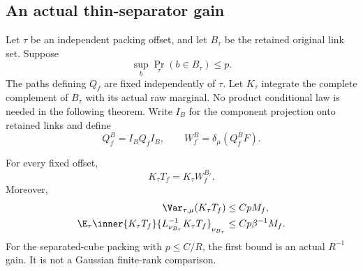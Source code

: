 \subsection{An actual thin-separator gain}

Let \(\tau\) be an independent packing offset, and let \(B_\tau\) be the
retained original link set. Suppose
\begin{equation}
 \sup_b\Pr_\tau(b\in B_\tau)\le p.
 \label{tr:thincondition}
\end{equation}
The paths defining \(Q_f\) are fixed independently of \(\tau\).
Let \(K_\tau\) integrate the complete complement of \(B_\tau\) with its
actual raw marginal. No product conditional law is needed in the following
theorem. Write \(I_B\) for the component projection onto retained links and
define
\[
 Q_f^B=I_BQ_fI_B,\qquad W_f^B=\delta_\mu(Q_f^BF).
\]

\begin{theorem}
\label{tr:separator}
For every fixed offset,
\begin{equation}
 K_\tau T_f=K_\tau W_f^{B_\tau}.
 \label{tr:maskidentity}
\end{equation}
Moreover,
\begin{align}
 \Var_{\tau,\mu}(K_\tau T_f)&\le CpM_f,
 \label{tr:meanthin}\\
 \E_\tau\inner{K_\tau T_f}
       {L_{\nu_{B_\tau}}^{-1}K_\tau T_f}_{\nu_{B_\tau}}
   &\le Cp\beta^{-1}M_f.
 \label{tr:inversethin}
\end{align}
For the separated-cube packing with \(p\le C/R\), the first bound is an
actual \(R^{-1}\) gain. It is not a Gaussian finite-rank comparison.
\end{theorem}

